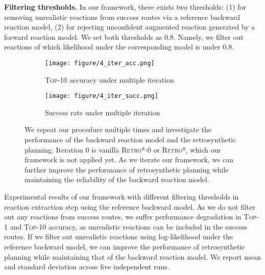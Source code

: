 \textbf{Filtering thresholds.}
In our framework, there exists two thresholds: (1)  for removing unrealistic reactions from success routes via a reference backward reaction model, (2)  for rejecting unconfident augmented reaction generated by a forward reaction model. We set both thresholds  as 0.8. Namely, we filter out reactions of which likelihood under the corresponding model is under 0.8.


















\begin{figure*}[t]
\vspace{0.1in}
\centering
\begin{subfigure}{0.45\textwidth}
\texttt{[image: figure/4\_iter\_acc.png]}
\caption{\textsc{Top-10} accuracy under multiple iteration}
\end{subfigure}
\begin{subfigure}{0.45\textwidth}
\texttt{[image: figure/4\_iter\_succ.png]}
\caption{Success rate under multiple iteration}
\end{subfigure}
\caption{We repeat our procedure multiple times and investigate the performance of the backward reaction model and the retrosynthetic planning. Iteration 0 is vanilla \textsc{Retro*-0} or \textsc{Retro*}, which our framework is not applied yet. As we iterate our framework, we can further improve the performance of retrosynthetic planning while maintaining the reliability of the backward reaction model.}
\label{fig:iter}
\end{figure*} \begin{table*}[ht!]
\caption{Experimental results of our framework with different filtering thresholds  in reaction extraction step using the reference backward model. As we do not filter out any reactions from success routes, we suffer performance degradation in \textsc{Top-1} and \textsc{Top-10} accuracy, as unrealistic reactions can be included in the success routes. If we filter out unrealistic reactions using log-likelihood under the reference backward model, we can improve the performance of retrosynthetic planning while maintaining that of the backward reaction model. We report mean and standard deviation across five independent runs.}
\label{tab:2_ablation_delta}
\begin{center}
\begin{sc}



\end{sc}
\end{center}
\end{table*}
